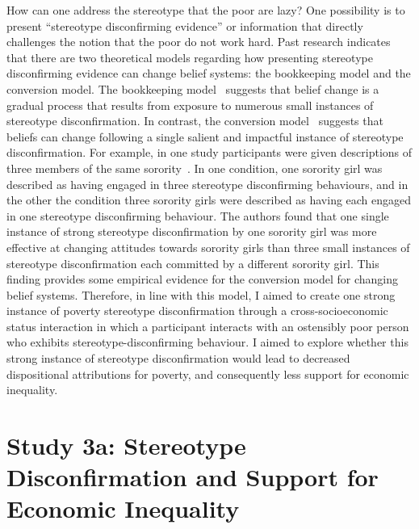 \documentclass{sfuthesis}
\begin{document}
How can one address the stereotype that the poor are lazy? One possibility is to present “stereotype disconfirming evidence” or information that directly challenges the notion that the poor do not work hard. Past research indicates that there are two theoretical models regarding how presenting stereotype disconfirming evidence can change belief systems: the bookkeeping model and the conversion model. The bookkeeping model~\cite{rothbart81} suggests that belief change is a gradual process that results from exposure to numerous small instances of stereotype disconfirmation. In contrast, the conversion model~\cite{rothbart81} suggests that beliefs can change following a single salient and impactful instance of stereotype disconfirmation. For example, in one study participants were given descriptions of three members of the same sorority~\cite{gurwitz77}. In one condition, one sorority girl was described as having engaged in three stereotype disconfirming behaviours, and in the other the condition three sorority girls were described as having each engaged in one stereotype disconfirming behaviour. The authors found that one single instance of strong stereotype disconfirmation by one sorority girl was more effective at changing attitudes towards sorority girls than three small instances of stereotype disconfirmation each committed by a different sorority girl. This finding provides some empirical evidence for the conversion model for changing belief systems. Therefore, in line with this model, I aimed to create one strong instance of poverty stereotype disconfirmation through a cross-socioeconomic status interaction in which a participant interacts with an ostensibly poor person who exhibits stereotype-disconfirming behaviour. I aimed to explore whether this strong instance of stereotype disconfirmation would lead to decreased dispositional attributions for poverty, and consequently less support for economic inequality.

\section{Study 3a: Stereotype Disconfirmation and Support for Economic Inequality}
\end{document}
